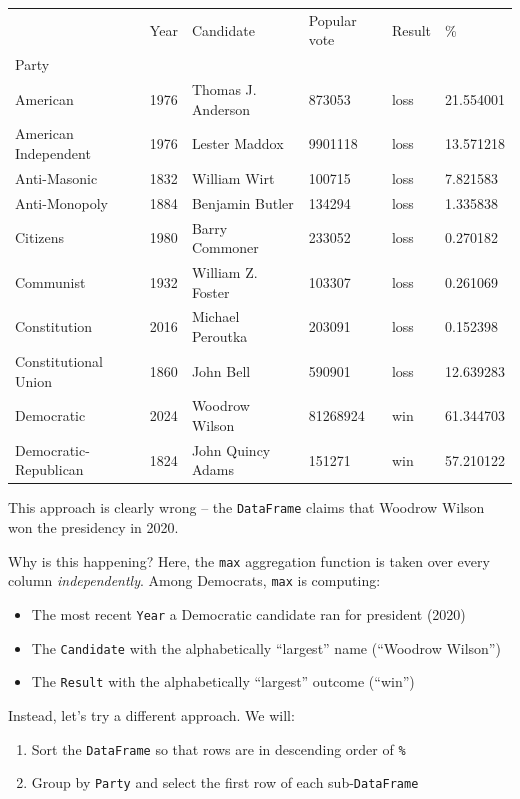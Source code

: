 \documentclass[
  letterpaper,
  DIV=11,
  numbers=noendperiod]{scrreprt}
\providecommand{\tightlist}{%
  \setlength{\itemsep}{0pt}\setlength{\parskip}{0pt}}\usepackage{longtable,booktabs,array}
\begin{document}
\begin{longtable}[]{@{}llllll@{}}
\toprule\noalign{}
& Year & Candidate & Popular vote & Result & \% \\
Party & & & & & \\
\midrule\noalign{}
\endhead
\bottomrule\noalign{}
\endlastfoot
American & 1976 & Thomas J. Anderson & 873053 & loss & 21.554001 \\
American Independent & 1976 & Lester Maddox & 9901118 & loss &
13.571218 \\
Anti-Masonic & 1832 & William Wirt & 100715 & loss & 7.821583 \\
Anti-Monopoly & 1884 & Benjamin Butler & 134294 & loss & 1.335838 \\
Citizens & 1980 & Barry Commoner & 233052 & loss & 0.270182 \\
Communist & 1932 & William Z. Foster & 103307 & loss & 0.261069 \\
Constitution & 2016 & Michael Peroutka & 203091 & loss & 0.152398 \\
Constitutional Union & 1860 & John Bell & 590901 & loss & 12.639283 \\
Democratic & 2024 & Woodrow Wilson & 81268924 & win & 61.344703 \\
Democratic-Republican & 1824 & John Quincy Adams & 151271 & win &
57.210122 \\
\end{longtable}

This approach is clearly wrong -- the \texttt{DataFrame} claims that
Woodrow Wilson won the presidency in 2020.

Why is this happening? Here, the \texttt{max} aggregation function is
taken over every column \emph{independently}. Among Democrats,
\texttt{max} is computing:

\begin{itemize}
\tightlist
\item
  The most recent \texttt{Year} a Democratic candidate ran for president
  (2020)
\item
  The \texttt{Candidate} with the alphabetically ``largest'' name
  (``Woodrow Wilson'')
\item
  The \texttt{Result} with the alphabetically ``largest'' outcome
  (``win'')
\end{itemize}

Instead, let's try a different approach. We will:

\begin{enumerate}
\def\labelenumi{\arabic{enumi}.}
\tightlist
\item
  Sort the \texttt{DataFrame} so that rows are in descending order of
  \texttt{\%}
\item
  Group by \texttt{Party} and select the first row of each
  sub-\texttt{DataFrame}
\end{enumerate}
\end{document}
